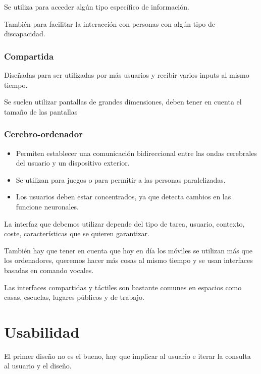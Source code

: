 \documentclass[12pt, twoside, openright]{report} %
\begin{document}
        Se utiliza para acceder algún tipo específico de información.

		También para facilitar la interacción con personas con algún
        tipo de discapacidad.

\subsubsection{Compartida}
        Diseñadas para ser utilizadas por más usuarios y recibir varios
        inputs al mismo tiempo.

		Se suelen utilizar pantallas de grandes dimensiones, deben tener
        en cuenta el tamaño de las pantallas

\subsubsection{Cerebro-ordenador}

      \begin{itemize}
      
      \item
        Permiten establecer una comunicación bidireccional entre las
        ondas cerebrales del usuario y un dispositivo exterior.
      \item
        Se utilizan para juegos o para permitir a las personas
        paralelizadas.
      \item
        Los usuarios deben estar concentrados, ya que detecta cambios en
        las funcione neuronales.
      \end{itemize}

	La interfaz que debemos utilizar depende del tipo de tarea, usuario,
    contexto, coste, características que se quieren garantizar.

	También hay que tener en cuenta que hoy en día los móviles se
    utilizan más que los ordenadores, queremos hacer más cosas al mismo
    tiempo y se usan interfaces basadas en comando vocales.

	Las interfaces compartidas y táctiles son bastante comunes en
    espacios como casas, escuelas, lugares públicos y de trabajo.

	
\section{Usabilidad}

  El primer diseño no es el bueno, hay que implicar al usuario e iterar
  la consulta al usuario y el diseño.
\end{document}
